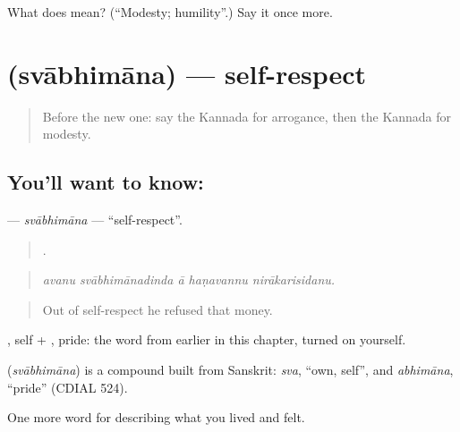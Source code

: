 \begin{tcolorbox}[breakable,colback=teal!4,colframe=teal!35!black,title={Before you move on}]
What does  mean? (\textquotedblleft{}Modesty; humility\textquotedblright{}.) Say it once more.
\end{tcolorbox}
\section[\texorpdfstring{\kn{ಸ್ವಾಭಿಮಾನ} (svābhimāna)}{ಸ್ವಾಭಿಮಾನ (svābhimāna)}]{ (svābhimāna) — self-respect}

\label{lesson:KA-C497-svabhimana}



\begin{quote}
Before the new one: say the Kannada for arrogance, then the Kannada for modesty.
\end{quote}

\subsection*{You'll want to know: }
\textbf{} — \emph{svābhimāna} — \textquotedblleft{}self-respect\textquotedblright{}.

\begin{quote}
    .
\end{quote}

\begin{quote}
\emph{avanu svābhimānadinda ā haṇavannu nirākarisidanu.}
\end{quote}

\begin{quote}
Out of self-respect he refused that money.
\end{quote}

, self + , pride: the word from earlier in this chapter, turned on yourself.

\begin{cousinweb}
\textbf{} (\emph{svābhimāna}) is a compound built from Sanskrit: \emph{sva}, \textquotedblleft{}own, self\textquotedblright{}, and \emph{abhimāna}, \textquotedblleft{}pride\textquotedblright{} (CDIAL 524).
\end{cousinweb}

\begin{grammarlens}[title={What you've built}]
One more word for describing what you lived and felt.
\end{grammarlens}

